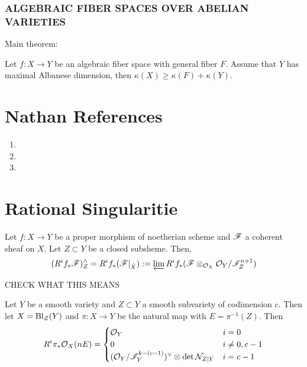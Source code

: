 \documentclass[12pt]{article}
\newcommand{\cN}{\mathcal{N}}
\begin{document}
\subsubsection{ALGEBRAIC FIBER SPACES OVER ABELIAN VARIETIES}

Main theorem:

\begin{theorem}
Let $f : X \to Y$ be an algebraic fiber space with general fiber $F$. Assume that $Y$ has maximal Albanese dimension, then $\kappa(X) \ge \kappa(F) + \kappa(Y)$. 
\end{theorem}

\section{Nathan References}

\begin{enumerate}
\item {}

\item {}

\item {}
\end{enumerate}

\section{Rational Singularitie}

\begin{theorem}
Let $f : X \to Y$ be a proper morphism of noetherian scheme and $\mathscr{F}$ a coherent sheaf on $X$. Let $Z \subset Y$ be a closed subsheme. Then,
\[ (R^i f_* \mathscr{F})^{\wedge}_{Z} = R^i f_* (\mathscr{F}|_{\hat{X}}) := \operatorname*{\varprojlim} R^i f_* (\mathscr{F} \otimes_ {\mathcal{O}_{X}} \mathcal{O}_{Y}/\mathscr{I}_Z^{n+1}) \] 
\end{theorem}

{\color{red} CHECK WHAT THIS MEANS}

\begin{lemma}
Let $Y$ be a smooth variety and $Z \subset Y$ a smooth subvariety of codimension $c$. Then let $X = \mathrm{Bl}_{Z}(Y)$ and $\pi : X \to Y$ be the natural map with $E = \pi^{-1}(Z)$. Then
\[ R^i \pi_* \struct{X}(n E) =
\begin{cases}
\struct{Y} & i = 0
\\
0 & i \neq 0, c-1
\\
(\struct{Y} / \I_Y^{k - (c-1)})^\vee \ot \det{\cN_{Z|Y}} & i = c - 1
\end{cases} \]
\end{lemma}
\end{document}
